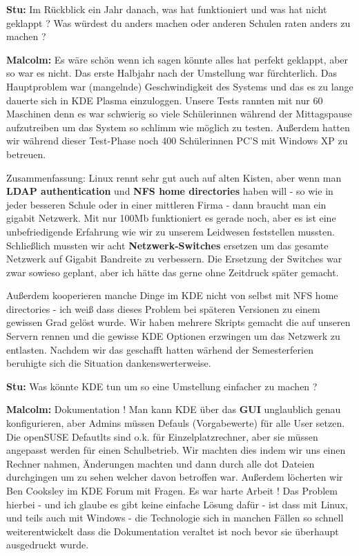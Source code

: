 \documentclass[10pt,a4paper,ngerman,twoside]{article} %
\begin{document}
\begin{multicols}{3}
\textbf{Stu:} Im Rückblick ein Jahr danach, was hat funktioniert und was hat nicht geklappt ? Was würdest du anders machen oder anderen Schulen raten anders zu machen ?

\textbf{Malcolm:} Es wäre schön wenn ich sagen könnte alles hat perfekt geklappt, aber so war es nicht. Das erste Halbjahr nach der Umstellung war fürchterlich. Das Hauptproblem war (mangelnde) Geschwindigkeit des Systems und das es zu lange dauerte sich in KDE Plasma einzuloggen. Unsere Tests rannten mit nur 60 Maschinen denn es war schwierig so viele Schülerinnen während der Mittagspause aufzutreiben um das System so schlimm wie möglich zu testen. Außerdem hatten wir während dieser Test-Phase noch 400 Schülerinnen PC'S mit Windows XP zu betreuen.

Zusammenfassung: Linux rennt sehr gut auch auf alten Kisten, aber wenn man \textbf{LDAP authentication} und \textbf{NFS home directories} haben will - so wie in jeder besseren Schule oder in einer mittleren Firma - dann braucht man ein gigabit Netzwerk. Mit nur 100Mb funktioniert es gerade noch, aber es ist eine unbefriedigende Erfahrung wie wir zu unserem Leidwesen feststellen mussten. Schließlich mussten wir acht \textbf{Netzwerk-Switches} ersetzen um das gesamte Netzwerk auf Gigabit Bandreite zu verbessern. Die Ersetzung der Switches war zwar sowieso geplant, aber ich hätte das gerne ohne Zeitdruck später gemacht.

Außerdem kooperieren manche Dinge im KDE nicht von selbst mit NFS home directories - ich weiß dass dieses Problem bei späteren Versionen zu einem gewissen Grad gelöst wurde. Wir haben mehrere Skripts gemacht die auf unseren Servern rennen und die gewisse KDE Optionen erzwingen um das Netzwerk zu entlasten. Nachdem wir das geschafft hatten wärhend der Semesterferien beruhigte sich die Situation dankenswerterweise.

\textbf{Stu:} Was könnte KDE tun um so eine Umstellung einfacher zu machen ?

\textbf{Malcolm:} Dokumentation ! Man kann KDE über das \textbf{GUI} unglaublich genau konfigurieren, aber Admins müssen Defauls (Vorgabewerte) für alle User setzen. Die openSUSE Defautlts sind o.k. für Einzelplatzrechner, aber sie müssen angepasst werden für einen Schulbetrieb. Wir machten dies indem wir uns einen Rechner nahmen, Änderungen machten und dann durch alle dot Dateien durchgingen um zu sehen welcher davon betroffen war. Außerdem löcherten wir Ben Cooksley im KDE Forum mit Fragen. Es war harte Arbeit ! Das Problem hierbei - und ich glaube es gibt keine einfache Lösung dafür - ist dass mit Linux, und teils auch mit Windows - die Technologie sich in manchen Fällen so schnell weiterentwickelt dass die Dokumentation veraltet ist noch bevor sie überhaupt ausgedruckt wurde.
 

\end{multicols}
\end{document}
